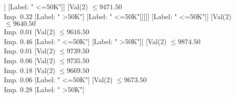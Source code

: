 \documentclass[margin=10pt]{standalone}
\begin{document}
\begin{forest}
																																		[Val($2$) $ \leq 9358.50$ \\ Imp. $0.01$
																																			[Label: " >50K"]
																																			[Val($2$) $ \leq 9605.50$ \\ Imp. $0.01$
																																				[Val($2$) $ \leq 9510.50$ \\ Imp. $0.07$
																																					[Val($2$) $ \leq 9396.50$ \\ Imp. $0.05$
																																						[Label: " <=50K"]
																																						[Val($2$) $ \leq 9405.50$ \\ Imp. $0.13$
																																							[Label: " >50K"]
																																							[Val($2$) $ \leq 9452.50$ \\ Imp. $0.06$
																																								[Val($2$) $ \leq 9410.50$ \\ Imp. $0.19$
																																									[Val($2$) $ \leq 9408.50$ \\ Imp. $0.92$
																																										[Label: " <=50K"]
																																										[Label: " >50K"]]
																																									[Label: " <=50K"]]
																																								[Val($2$) $ \leq 9471.50$ \\ Imp. $0.32$
																																									[Label: " >50K"]
																																									[Label: " <=50K"]]]]]
																																					[Label: " <=50K"]]
																																				[Val($2$) $ \leq 9640.50$ \\ Imp. $0.01$
																																					[Val($2$) $ \leq 9616.50$ \\ Imp. $0.46$
																																						[Label: " <=50K"]
																																						[Label: " >50K"]]
																																					[Val($2$) $ \leq 9874.50$ \\ Imp. $0.01$
																																						[Val($2$) $ \leq 9739.50$ \\ Imp. $0.06$
																																							[Val($2$) $ \leq 9735.50$ \\ Imp. $0.18$
																																								[Val($2$) $ \leq 9669.50$ \\ Imp. $0.06$
																																									[Label: " <=50K"]
																																									[Val($2$) $ \leq 9673.50$ \\ Imp. $0.28$
																																										[Label: " >50K"]

\end{forest}
\end{document}
